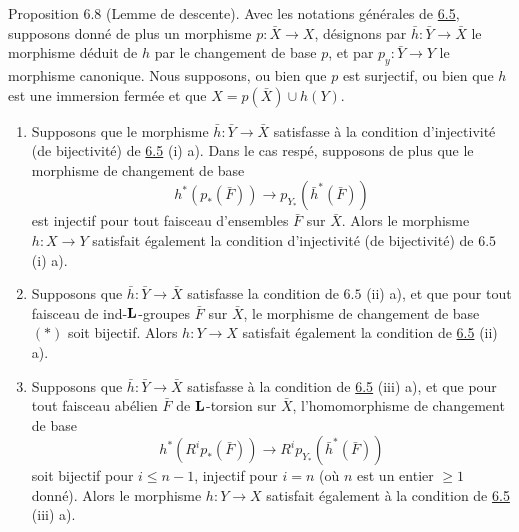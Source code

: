 \documentclass[10pt]{../fichiers-configuration-latex/smfart}
\begin{document}
\begin{enonce*}{Proposition 6.8}
(Lemme de descente). Avec les notations générales de \hyperref[XII.prop6.5]{6.5}, supposons
donné de plus un morphisme $p:\bar{X}\rightarrow X$, désignons par
$\bar{h}:\bar{Y}\rightarrow \bar{X}$ le morphisme déduit de $h$ par le
changement de base $p$, et par $p_y:\bar{Y}\rightarrow Y$ le morphisme
canonique. Nous supposons, ou bien que $p$ est surjectif, ou bien que
$h$ est une immersion fermée et que $X=p(\bar{X})\cup h(Y)$.
\begin{enumerate}
\renewcommand{\theenumi}{\roman{enumi}}
\renewcommand{\labelenumi}{(\theenumi)}
\item Supposons que le morphisme $\bar{h}:\bar{Y}\rightarrow \bar{X}$
satisfasse à la condition d'injectivité (\resp de bijectivité) de
\hyperref[XII.prop6.5]{6.5} {\rm(i) a)}. Dans le cas respé, supposons de plus que le
morphisme de changement de base
\begin{equation*}
h^{\ast}(p_{\ast}(\bar{F}))\longrightarrow
p_{Y_{\ast}}(\bar{h}^{\ast}(\bar{F}))\tag{$\ast$} 
\end{equation*}
est injectif pour tout faisceau d'ensembles $\bar{F}$ sur
$\bar{X}$. Alors le morphisme $h:X\rightarrow Y$ satisfait également
la condition d'injectivité (\resp de bijectivité) de $6.5$ {\rm(i)
a).}

\item Supposons que $\bar{h}:\bar{Y}\rightarrow \bar{X}$ satisfasse la
condition de $6.5$ {\rm(ii) a)}, et que pour tout faisceau de
{\rm ind}-$\mathbf{L}$-groupes $\bar{F}$ sur $\bar{X}$, le morphisme de
changement de base $(\ast)$ soit bijectif. Alors $h:Y\rightarrow X$
satisfait également la condition de {\rm \hyperref[XII.prop6.5]{6.5} (ii) a).}

\item Supposons que $\bar{h}:\bar{Y}\rightarrow \bar{X}$ satisfasse à
la condition de {\rm \hyperref[XII.prop6.5]{6.5} (iii) a),} et que pour tout faisceau abélien
$\bar{F}$ de $\mathbf{L}$-torsion sur $\bar{X}$, l'homomorphisme de
changement de base
$$
h^{\ast}(R^{i}p_{\ast}(\bar{F}))\longrightarrow
R^{i}p_{Y_{\ast}}(\bar{h}^{\ast}(\bar{F}))
$$
soit bijectif pour $i\leq n-1$, injectif pour $i=n$ (où $n$ est un
entier $\geq 1$ donné). Alors le morphisme $h:Y\rightarrow X$
satisfait également à la condition de {\rm \hyperref[XII.prop6.5]{6.5} (iii) a).}
\end{enumerate}
\end{enonce*}
\end{document}
